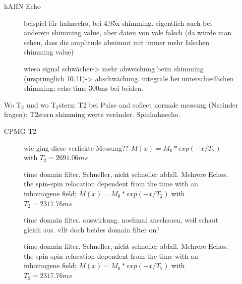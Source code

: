 hAHN Echo

\begin{figure}[ht]
    \centering
    
    \caption[]{beispiel für hahnecho, bei 4.95x shimming. eigentlich auch bei anderem shimming value, aber daten von vale falsch (da würde man sehen, dass die amplitude abnimmt mit immer mehr falschen shimming value)}
    \label{fig:Echobeispeilsignal}
\end{figure}
\begin{figure}[ht]
    \centering
    
    \caption[]{wieso signal schwächer-> mehr abweichung beim shimming (ursprünglich 10.11)-> abschwächung. integrale bei unterschiedlichen shimming; echo time 300ms bei beiden. }
    \label{fig:SpinEcho}
\end{figure}
%     

Wo T$_2$ und wo T$_2$stern: T2 bei Pulse and collect normale messung (Narinder fragen): T2stern shimming werte veränder. Spinhahnecho.



CPMG T2

\begin{figure}[ht]
    \centering
    
    \caption[]{wie ging diese verfickte Messung?? $M(x)=M_0 * exp(-x/T_2)$ with $T_2=\si{2691.06}{ms}$}
    \label{fig:T2}
\end{figure}

\begin{figure}[ht]
    \centering
    
    \caption[]{time domain filter. Schneller, nicht schneller abfall. Mehrere Echos. the spin-spin relacation dependent from the time with an inhomogene field; $M(x)=M_0 * exp(-x/T_2)$ with $T_2=\si{2317.76}{ms}$}
    \label{fig:CPMG}
\end{figure}

\begin{figure}[ht]
    \centering
    
    \caption[]{time domain filter. auswirkung. nochmal anschauen, weil schaut gleich aus. vllt doch beides domain filter on?}
    \label{fig:timedomain}
\end{figure}

\begin{figure}[ht]
    \centering
    
    \caption[]{time domain filter. Schneller, nicht schneller abfall. Mehrere Echos. the spin-spin relacation dependent from the time with an inhomogene field; $M(x)=M_0 * exp(-x/T_2)$ with $T_2=\si{2317.76}{ms}$}
    \label{fig:CPMG}
\end{figure}
